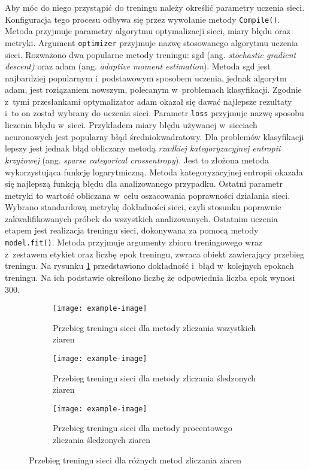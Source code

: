Aby móc do niego przystąpić do treningu należy określić parametry uczenia
sieci.
Konfiguracja tego procesu odbywa się przez wywołanie metody
\texttt{Compile()}.
Metoda przyjmuje parametry algorytmu optymalizacji sieci, miary błędu oraz
metryki.
Argument \texttt{optimizer} przyjmuje  nazwę stosowanego
algorytmu uczenia sieci.
Rozważono dwa popularne metody treningu: sgd (ang. \emph{stochastic gradient
descent)} oraz adam (ang. \emph{adaptive moment estimation}).
Metoda sgd jest najbardziej popularnym i~podstawowym sposobem uczenia, jednak
algorytm adam, jest roziązaniem nowszym, polecanym w~problemach klasyfikacji.
Zgodnie z~tymi przesłankami optymalizator adam okazał się dawać najlepsze
rezultaty i~to on został wybrany do uczenia sieci.
Parametr \texttt{loss} przyjmuje nazwę sposobu liczenia błędu
w~sieci.
Przykładem miary błędu używanej w~sieciach neuronowych jest popularny
błąd średniokwadratowy.
Dla problemów klasyfikacji lepszy jest jednak błąd obliczany metodą
\emph{rzadkiej kategoryzacyjnej entropii krzyżowej} (ang. \textit{sparse
categorical crossentropy}).
Jest to złożona metoda wykorzystująca funkcję logarytmiczną.
Metoda kategoryzacyjnej entropii okazała się najlepszą funkcją błędu
dla analizowanego przypadku.
Ostatni parametr metryki to wartość obliczana w~celu oszacowania poprawności
działania sieci.
Wybrano standardową metrykę dokładności sieci, czyli stosunku poprawnie
zakwalifikowanych próbek do wszystkich analizowanych.
Ostatnim uczenia etapem jest realizacja treningu sieci, dokonywana za pomocą
metody \texttt{model.fit()}.
Metoda przyjmuje argumenty zbioru treningowego wraz z~zestawem etykiet
oraz liczbę epok treningu, zwraca obiekt zawierający przebieg treningu.
Na rysunku \ref{fig:history} przedstawiono dokładność i~błąd w~kolejnych
epokach treningu.
Na ich podstawie określono liczbę że odpowiednia liczba epok wynosi 300.
\begin{figure}[htbp]
	\centering
	\begin{subfigure}[t]{0.3\textwidth}
		\centering
		\texttt{[image: example-image]}
		\caption{Przebieg treningu sieci dla metody zliczania wszystkich
		         ziaren}
	\end{subfigure}
	\hspace{0.25cm}
	\centering
	\begin{subfigure}[t]{0.3\textwidth}
		\centering
		\texttt{[image: example-image]}
		\caption{Przebieg treningu sieci dla metody zliczania śledzonych 
		         ziaren}
	\end{subfigure}
	\hspace{0.25cm}
	\begin{subfigure}[t]{0.3\textwidth}
		\centering
		\texttt{[image: example-image]}
		\caption{Przebieg treningu sieci dla metody procentowego zliczania
		         śledzonych ziaren}
	\end{subfigure}
	\caption{Przebieg treningu sieci dla różnych metod zliczania ziaren}
	\label{fig:history}
\end{figure}
